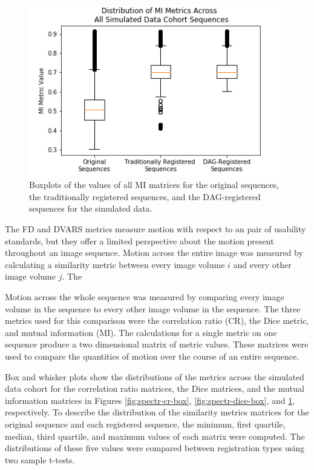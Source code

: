 \begin{figure}
\centering
\includegraphics[height=0.3\textheight]{6/figures/spectr-mi-box.png}
\caption{Boxplots of the values of all MI matrices for the original sequences, the traditionally registered sequences, and the DAG-registered sequences for the simulated data.}
\label{fig:spectr-mi-box}
\end{figure}

The FD and DVARS metrics measure motion with respect to an pair of usability standards, but they offer a limited perspective about the motion present throughout an image sequence. Motion across the entire image was measured by calculating a similarity metric between every image volume $i$ and every other image volume $j$. The 

Motion across the whole sequence was measured by comparing every image volume in the sequence to every other image volume in the sequence. The three metrics used for this comparison were the correlation ratio (CR), the Dice metric, and mutual information (MI). The calculations for a single metric on one sequence produce a two dimensional matrix of metric values. These matrices were used to compare the quantities of motion over the course of an entire sequence. 

Box and whisker plots show the distributions of the metrics across the simulated data cohort for the correlation ratio matrices, the Dice matrices, and the mutual information matrices in Figures \ref{fig:spectr-cr-box}, \ref{fig:spectr-dice-box}, and \ref{fig:spectr-mi-box}, respectively. To describe the distribution of the similarity metrics matrices for the original sequence and each registered sequence, the minimum, first quartile, median, third quartile, and maximum values of each matrix were computed. The distributions of these five values were compared between registration types using two sample t-tests. 

